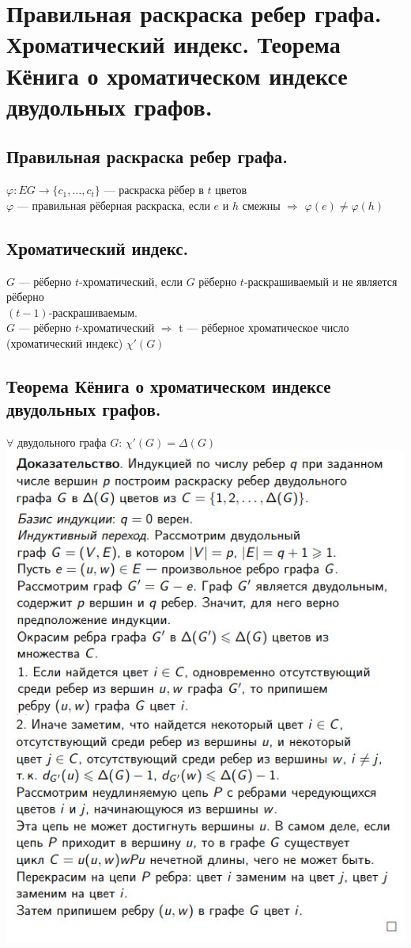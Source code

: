 \documentclass[12pt]{article}
\begin{document}
\section{Правильная раскраска ребер графа. Хроматический индекс. Теорема Кёнига о хроматическом индексе двудольных графов.}
\subsection{Правильная раскраска ребер графа.}
	$\varphi: EG \to \{c_1,\dotsc,c_t\}$ — раскраска рёбер в $t$ цветов\\
	$\varphi$ 	— правильная рёберная раскраска, если $e$ и $h$ смежны $\Rightarrow$ $\varphi(e) \neq \varphi(h)$\\
\subsection{Хроматический индекс.}
	$G$ — рёберно $t$-хроматический, если $G$ рёберно $t$-раскрашиваемый и не является рёберно\\$(t-1)$-раскрашиваемым.\\
	$G$ — рёберно $t$-хроматический $\Rightarrow$ t — рёберное хроматическое число (хроматический индекс) $\chi'(G)$
\subsection{Теорема Кёнига о хроматическом индексе двудольных графов.}
	$\forall$ двудольного графа $G$: $\chi'(G) = \Delta(G)$\\
	\includegraphics[width=400pt]{12}\\
\end{document}
